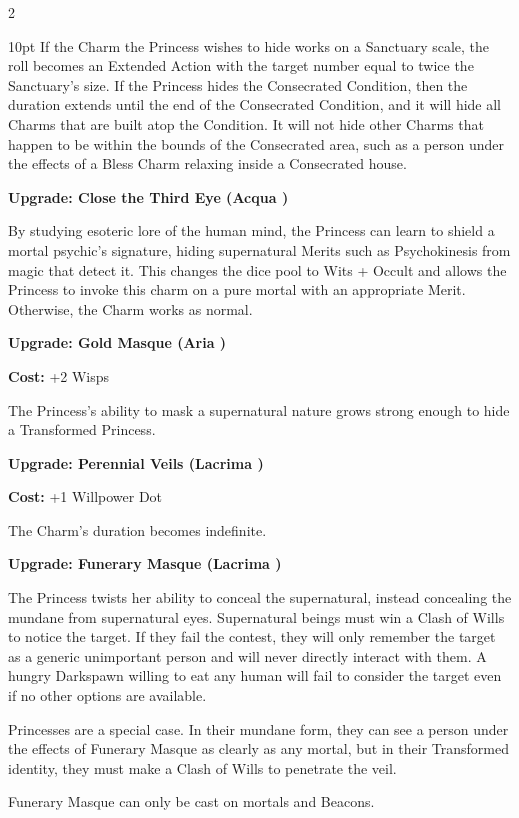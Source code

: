 \begin{multicols}{2}
\begin{myindentpar}{10pt}
If the Charm the Princess wishes to hide works on a Sanctuary scale, the roll becomes an Extended Action with the target number equal to twice the Sanctuary's size. If the Princess hides the Consecrated Condition, then the duration extends until the end of the Consecrated Condition, and it will hide all Charms that are built atop the Condition. It will not hide other Charms that happen to be within the bounds of the Consecrated area, such as a person under the effects of a Bless Charm relaxing inside a Consecrated house. 

\textbf{Upgrade: Close the Third Eye (Acqua \textbullet\textbullet)}

By studying esoteric lore of the human mind, the Princess can learn to shield a mortal psychic's signature, hiding supernatural Merits such as Psychokinesis from magic that detect it. This changes the dice pool to Wits + Occult and allows the Princess to invoke this charm on a pure mortal with an appropriate Merit. Otherwise, the Charm works as normal.  

\textbf{Upgrade: Gold Masque (Aria \textbullet\textbullet)}

\textbf{Cost:} +2 Wisps

The Princess's ability to mask a supernatural nature grows strong enough to hide a Transformed Princess. 

\textbf{Upgrade: Perennial Veils (Lacrima \textbullet\textbullet\textbullet)}

\textbf{Cost:} +1 Willpower Dot

The Charm's duration becomes indefinite. 

\textbf{Upgrade: Funerary Masque (Lacrima \textbullet\textbullet\textbullet\textbullet)}

The Princess twists her ability to conceal the supernatural, instead concealing the mundane from supernatural eyes. Supernatural beings must win a Clash of Wills to notice the target. If they fail the contest, they will only remember the target as a generic unimportant person and will never directly interact with them. A hungry Darkspawn willing to eat any human will fail to consider the target even if no other options are available. 

Princesses are a special case. In their mundane form, they can see a person under the effects of Funerary Masque as clearly as any mortal, but in their Transformed identity, they must make a Clash of Wills to penetrate the veil. 

Funerary Masque can only be cast on mortals and Beacons. 


\end{myindentpar}
\end{multicols}
